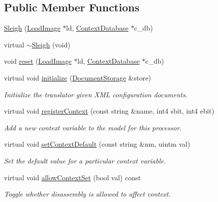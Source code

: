 \subsection*{Public Member Functions}
\begin{DoxyCompactItemize}
\item 
\mbox{\hyperlink{class_sleigh_a06ab69bb8b47d54d0fce4a222569e21f}{Sleigh}} (\mbox{\hyperlink{class_load_image}{Load\+Image}} $\ast$ld, \mbox{\hyperlink{class_context_database}{Context\+Database}} $\ast$c\+\_\+db)
\item 
virtual \mbox{\hyperlink{class_sleigh_a258cd9fc30c87a071a75d6450dea54fc}{$\sim$\+Sleigh}} (void)
\item 
void \mbox{\hyperlink{class_sleigh_a2a9dc927d88ccb1ebece23293fb75b9c}{reset}} (\mbox{\hyperlink{class_load_image}{Load\+Image}} $\ast$ld, \mbox{\hyperlink{class_context_database}{Context\+Database}} $\ast$c\+\_\+db)
\item 
virtual void \mbox{\hyperlink{class_sleigh_aca7ce17e881917e515aa45ea48810e45}{initialize}} (\mbox{\hyperlink{class_document_storage}{Document\+Storage}} \&store)
\begin{DoxyCompactList}\small\item\em Initialize the translator given X\+ML configuration documents. \end{DoxyCompactList}\item 
virtual void \mbox{\hyperlink{class_sleigh_a7df1e3c0c4e2fa3090b6e38f53498aa1}{register\+Context}} (const string \&name, int4 sbit, int4 ebit)
\begin{DoxyCompactList}\small\item\em Add a new context variable to the model for this processor. \end{DoxyCompactList}\item 
virtual void \mbox{\hyperlink{class_sleigh_ac44342619fef0c42a0f65c415683e58e}{set\+Context\+Default}} (const string \&nm, uintm val)
\begin{DoxyCompactList}\small\item\em Set the default value for a particular context variable. \end{DoxyCompactList}\item 
virtual void \mbox{\hyperlink{class_sleigh_a82409ca16da71a07eb338aa71b64882c}{allow\+Context\+Set}} (bool val) const
\begin{DoxyCompactList}\small\item\em Toggle whether disassembly is allowed to affect context. \end{DoxyCompactList}\item 

\end{DoxyCompactItemize}
